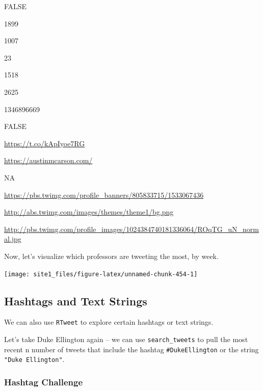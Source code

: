 \documentclass[]{book}
\newenvironment{Shaded}{\begin{snugshade}}{\end{snugshade}}
\newcommand{\KeywordTok}[1]{\textcolor[rgb]{0.13,0.29,0.53}{\textbf{#1}}}
\newcommand{\DataTypeTok}[1]{\textcolor[rgb]{0.13,0.29,0.53}{#1}}
\newcommand{\StringTok}[1]{\textcolor[rgb]{0.31,0.60,0.02}{#1}}
\newcommand{\OperatorTok}[1]{\textcolor[rgb]{0.81,0.36,0.00}{\textbf{#1}}}
\newcommand{\NormalTok}[1]{#1}
\begin{document}
FALSE

1899

1007

23

1518

2625

1346896669

FALSE

\url{https://t.co/kApIyoe7RG}

\url{https://austinmcarson.com/}

NA

\url{https://pbs.twimg.com/profile_banners/805833715/1533067436}

\url{http://abs.twimg.com/images/themes/theme1/bg.png}

\url{http://pbs.twimg.com/profile_images/1024384740181336064/ROqTG_uN_normal.jpg}

Now, let's visualize which professors are tweeting the most, by week.

\begin{Shaded}
\end{Shaded}

\begin{center}\texttt{[image: site1\_files/figure-latex/unnamed-chunk-454-1]} \end{center}

\subsection{Hashtags and Text Strings}\label{hashtags-and-text-strings}

We can also use \texttt{RTweet} to explore certain hashtags or text
strings.

Let's take Duke Ellington again -- we can use \texttt{search\_tweets} to
pull the most recent n number of tweets that include the hashtag
\texttt{\#DukeEllington} or the string \texttt{"Duke\ Ellington"}.

\subsubsection*{Hashtag Challenge}\label{hashtag-challenge}
\end{document}
